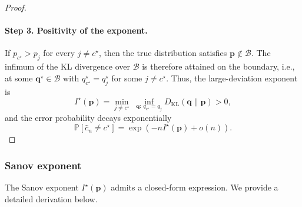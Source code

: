 \begin{proof}[Proof]
    \paragraph{Step 3. Positivity of the exponent.}
    If $p_{c^\star}>p_j$ for every $j \neq c^\star$, then the true distribution satisfies $\mathbf p\notin\mathcal B$.
    The infimum of the KL divergence over $\mathcal B$ is therefore attained on the boundary, i.e., at some $\mathbf q^\star \in \mathcal B$ with $q^\star_{c^\star} = q^\star_{j}$ for some $j \neq c^\star$. 
Thus, the large-deviation exponent is
$$
I^\star (\mathbf{p})
=\min_{j \neq c^\star}\;
\inf_{\mathbf{q}:\,q_{c^\star}=q_j}D_{\mathrm{KL}}(\mathbf q\|\mathbf p)
>0,
$$
and the error probability decays exponentially
$$
\mathbb P[\hat{c}_n \neq c^\star] = \exp(-n I^\star(\mathbf p) + o(n)).
$$
\end{proof}
\subsubsection{Sanov exponent}
The Sanov exponent $I^\star(\mathbf{p})$ admits a closed-form expression. We provide a detailed derivation below.

